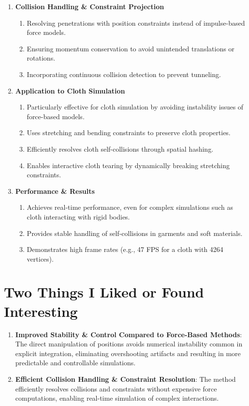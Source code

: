 \documentclass[12pt]{article}
\begin{document}
\begin{enumerate}[noitemsep]
    \item \textbf{Collision Handling \& Constraint Projection}
    \begin{enumerate}[noitemsep]
        \item Resolving penetrations with position constraints instead of impulse-based force models.
        \item Ensuring momentum conservation to avoid unintended translations or rotations.
        \item Incorporating continuous collision detection to prevent tunneling.
    \end{enumerate}
    
    \item \textbf{Application to Cloth Simulation}
    \begin{enumerate}[noitemsep]
        \item Particularly effective for cloth simulation by avoiding instability issues of force-based models.
        \item Uses stretching and bending constraints to preserve cloth properties.
        \item Efficiently resolves cloth self-collisions through spatial hashing.
        \item Enables interactive cloth tearing by dynamically breaking stretching constraints.
    \end{enumerate}
    
    \item \textbf{Performance \& Results}
    \begin{enumerate}[noitemsep]
        \item Achieves real-time performance, even for complex simulations such as cloth interacting with rigid bodies.
        \item Provides stable handling of self-collisions in garments and soft materials.
        \item Demonstrates high frame rates (e.g., 47 FPS for a cloth with 4264 vertices).
    \end{enumerate}
\end{enumerate}

\section{Two Things I Liked or Found Interesting}
\begin{enumerate}[noitemsep]
    \item \textbf{Improved Stability \& Control Compared to Force-Based Methods}: The direct manipulation of positions avoids numerical instability common in explicit integration, eliminating overshooting artifacts and resulting in more predictable and controllable simulations.
    \item \textbf{Efficient Collision Handling \& Constraint Resolution}: The method efficiently resolves collisions and constraints without expensive force computations, enabling real-time simulation of complex interactions.
\end{enumerate}
\end{document}
